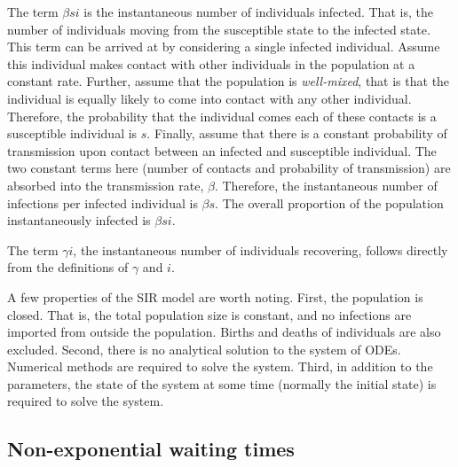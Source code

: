 \documentclass[thesis.tex]{subfiles}
\begin{document}
The term $\beta si$ is the instantaneous number of individuals infected.
That is, the number of individuals moving from the susceptible state to the infected state.
This term can be arrived at by considering a single infected individual.
Assume this individual makes contact with other individuals in the population at a constant rate.
Further, assume that the population is \emph{well-mixed}, that is that the individual is equally likely to come into contact with any other individual.
Therefore, the probability that the individual comes each of these contacts is a susceptible individual is $s$.
Finally, assume that there is a constant probability of transmission upon contact between an infected and susceptible individual.
The two constant terms here (number of contacts and probability of transmission) are absorbed into the transmission rate, $\beta$.
Therefore, the instantaneous number of infections per infected individual is $\beta s$.
The overall proportion of the population instantaneously infected is $\beta si$.

The term $\gamma i$, the instantaneous number of individuals recovering, follows directly from the definitions of $\gamma$ and $i$.

A few properties of the SIR model are worth noting.
First, the population is closed.
That is, the total population size is constant, and no infections are imported from outside the population.
Births and deaths of individuals are also excluded.
Second, there is no analytical solution to the system of ODEs.
Numerical methods are required to solve the system.
Third, in addition to the parameters, the state of the system at some time (normally the initial state) is required to solve the system.


\subsection{Non-exponential waiting times}
\end{document}
